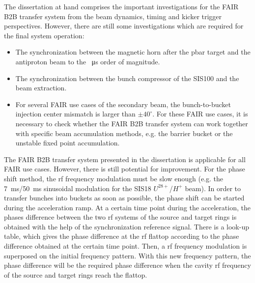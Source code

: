 The dissertation at hand comprises the important investigations for the FAIR B2B transfer system from the beam dynamics, timing and kicker trigger perspectives. However, there are still some investigations which are required for the final system operation:
\begin{itemize}
	\item The synchronization between the magnetic horn after the pbar target and the antiproton beam to the \SI{}{\us} order of magnitude.

	\item  The synchronization between the bunch compressor of the SIS100 and the beam extraction.

	\item  
For several FAIR use cases of the secondary beam, the bunch-to-bucket injection center mismatch is larger than $\pm40^\circ$. For these FAIR use cases, it is necessary to check whether the FAIR B2B transfer system can work together with specific beam accumulation methods, e.g. the barrier bucket or the unstable fixed point accumulation.


\end{itemize}


The FAIR B2B transfer system presented in the dissertation is applicable for all FAIR use cases. However, there is still potential for improvement. For the phase shift method, the rf frequency modulation must be slow enough (e.g. the \SI{7}{\ms}/\SI{50}{\ms} sinusoidal modulation for the SIS18 $U^\mathit{28+}$/$H^\mathit{+}$ beam). In order to transfer bunches into buckets as soon as possible, the phase shift can be started during the acceleration ramp. At a certain time point during the acceleration, the phases difference between the two rf systems of the source and target rings is obtained with the help of the synchronization reference signal. There is a look-up table, which gives the phase difference at the rf flattop according to the phase difference obtained at the certain time point. Then, a rf frequency modulation is superposed on the initial frequency pattern. With this new frequency pattern, the phase difference will be the required phase difference when the cavity rf frequency of the source and target rings reach the flattop. 

